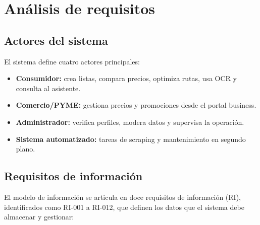 \chapter{An\'alisis de requisitos}\label{requisitos}

\section{Actores del sistema}

El sistema define cuatro actores principales:

\begin{itemize}
	\item \textbf{Consumidor:} crea listas, compara precios, optimiza rutas, usa OCR
		y consulta al asistente.
	\item \textbf{Comercio/PYME:} gestiona precios y promociones desde el portal business.
	\item \textbf{Administrador:} verifica perfiles, modera datos y supervisa la operaci\'on.
	\item \textbf{Sistema automatizado:} tareas de scraping y mantenimiento en segundo plano.
\end{itemize}

\section{Requisitos de informaci\'on}

El modelo de informaci\'on se articula en doce requisitos de informaci\'on (RI), identificados
como RI-001 a RI-012, que definen los datos que el sistema debe almacenar y gestionar:

